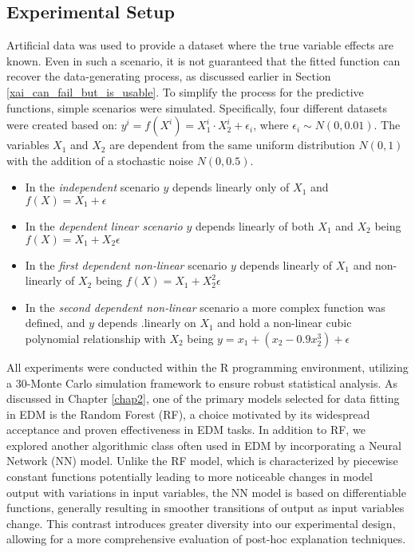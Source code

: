 \subsection{Experimental Setup}

Artificial data was used to provide a dataset where the true variable effects are known. Even in such a scenario, it is not guaranteed that the fitted function can recover the data-generating process, as discussed earlier in Section  \ref{xai_can_fail_but_is_usable}. To simplify the process for the predictive functions, simple scenarios were simulated. Specifically, four different datasets were created based on: $y^{i} = f(X^{i}) = X_{1}^{i} \cdot X_{2}^{i} + \epsilon_i$, where $\epsilon_i \sim N(0, 0.01)$. The variables $X_{1}$ and $X_{2}$ are dependent from the same uniform distribution $N(0,1)$ with the addition of a stochastic noise $N(0, 0.5)$. 

\begin{itemize}
    \item In the \textit{independent} scenario $y$ depends linearly only of $X_{1}$ and $f(X) = X_{1} + \epsilon$
    \item In the \textit{dependent linear scenario} $y$ depends linearly of both $X_{1}$ and $X_{2}$ being $f(X) = X_{1} + X_{2} \epsilon$
    \item In the \textit{first dependent non-linear} scenario $y$ depends linearly of $X_{1}$ and non-linearly of $X_{2}$ being  $f(X) = X_{1} + X_{2}^2 \epsilon$
    \item In the \textit{second dependent non-linear} scenario a more complex function was defined, and $y$ depends
    .linearly on $X_{1}$ and hold a non-linear cubic polynomial relationship with $X_{2}$ being  $y = x_1 + (x_2 - 0.9 x_2^3) + \epsilon$
\end{itemize}

All experiments were conducted within the R programming environment, utilizing a 30-Monte Carlo simulation framework to ensure robust statistical analysis. As discussed in Chapter \ref{chap2}, one of the primary models selected for data fitting in EDM is the Random Forest (RF), a choice motivated by its widespread acceptance and proven effectiveness in EDM tasks. In addition to RF, we explored another algorithmic class often used in EDM by incorporating a Neural Network (NN) model. Unlike the RF model, which is characterized by piecewise constant functions potentially leading to more noticeable changes in model output with variations in input variables, the NN model is based on differentiable functions, generally resulting in smoother transitions of output as input variables change. This contrast introduces greater diversity into our experimental design, allowing for a more comprehensive evaluation of post-hoc explanation techniques. 

